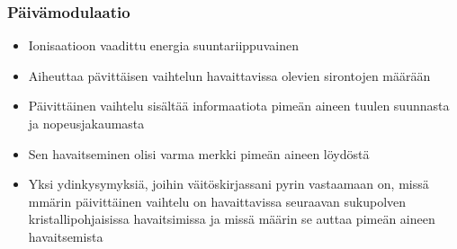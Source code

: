 \documentclass[beamer,11pt,aspectratio=169]{beamer}
\begin{document}
\begin{frame}
    \frametitle{Päivämodulaatio}
    \begin{itemize}
        \item Ionisaatioon vaadittu energia suuntariippuvainen
        \item Aiheuttaa pävittäisen vaihtelun havaittavissa olevien sirontojen määrään
        \item Päivittäinen vaihtelu sisältää informaatiota pimeän aineen tuulen suunnasta ja nopeusjakaumasta
        \item Sen havaitseminen olisi varma merkki pimeän aineen löydöstä
        \item Yksi ydinkysymyksiä, joihin väitöskirjassani pyrin vastaamaan on, missä mmärin päivittäinen vaihtelu on havaittavissa seuraavan sukupolven kristallipohjaisissa havaitsimissa ja missä määrin se auttaa pimeän aineen havaitsemista
    \end{itemize}
\end{frame}
\end{document}
